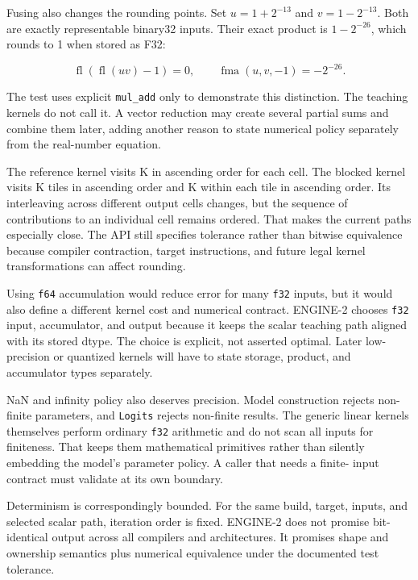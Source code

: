 \documentclass[
  10pt,
]{article}
\begin{document}
Fusing also changes the rounding points. Set \(u=1+2^{-13}\) and
\(v=1-2^{-13}\). Both are exactly representable binary32 inputs. Their
exact product is \(1-2^{-26}\), which rounds to 1 when stored as F32:

\[
\operatorname{fl}(\operatorname{fl}(uv)-1)=0,
\qquad \operatorname{fma}(u,v,-1)=-2^{-26}.
\]

The test uses explicit \texttt{mul\_add} only to demonstrate this
distinction. The teaching kernels do not call it. A vector reduction may
create several partial sums and combine them later, adding another
reason to state numerical policy separately from the real-number
equation.

The reference kernel visits K in ascending order for each cell. The
blocked kernel visits K tiles in ascending order and K within each tile
in ascending order. Its interleaving across different output cells
changes, but the sequence of contributions to an individual cell remains
ordered. That makes the current paths especially close. The API still
specifies tolerance rather than bitwise equivalence because compiler
contraction, target instructions, and future legal kernel
transformations can affect rounding.

Using \texttt{f64} accumulation would reduce error for many \texttt{f32}
inputs, but it would also define a different kernel cost and numerical
contract. ENGINE-2 chooses \texttt{f32} input, accumulator, and output
because it keeps the scalar teaching path aligned with its stored dtype.
The choice is explicit, not asserted optimal. Later low-precision or
quantized kernels will have to state storage, product, and accumulator
types separately.

NaN and infinity policy also deserves precision. Model construction
rejects non-finite parameters, and \texttt{Logits} rejects non-finite
results. The generic linear kernels themselves perform ordinary
\texttt{f32} arithmetic and do not scan all inputs for finiteness. That
keeps them mathematical primitives rather than silently embedding the
model's parameter policy. A caller that needs a finite- input contract
must validate at its own boundary.

Determinism is correspondingly bounded. For the same build, target,
inputs, and selected scalar path, iteration order is fixed. ENGINE-2
does not promise bit-identical output across all compilers and
architectures. It promises shape and ownership semantics plus numerical
equivalence under the documented test tolerance.
\end{document}
